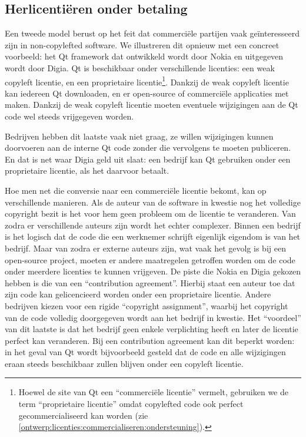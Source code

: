 \subsection{Herlicentiëren onder betaling}
\label{ontwerp:licenties:commercialiseren:herlicentieren}

Een tweede model berust op het feit dat commerciële partijen vaak geïnteresseerd zijn in non-copylefted software. We illustreren dit opnieuw met een concreet voorbeeld: het Qt framework dat ontwikkeld wordt door Nokia en uitgegeven wordt door Digia. Qt is beschikbaar onder verschillende licenties: een weak copyleft licentie, en een proprietaire licentie\footnote{Hoewel de site van Qt een ``commerciële licentie'' vermelt, gebruiken we de term ``proprietaire licentie'' omdat copylefted code ook perfect gecommercialiseerd kan worden (zie \ref{ontwerp:licenties:commercialiseren:ondersteuning}).}. Dankzij de weak copyleft licentie kan iedereen Qt downloaden, en er open-source of commerciële applicaties met maken. Dankzij de weak copyleft licentie moeten eventuele wijzigingen aan de Qt code wel steeds vrijgegeven worden.

Bedrijven hebben dit laatste vaak niet graag, ze willen wijzigingen kunnen doorvoeren aan de interne Qt code zonder die vervolgens te moeten publiceren. En dat is net waar Digia geld uit slaat: een bedrijf kan Qt gebruiken onder een proprietaire licentie, als het daarvoor betaalt.

Hoe men net die conversie naar een commerciële licentie bekomt, kan op verschillende manieren. Als de auteur van de software in kwestie nog het volledige copyright bezit is het voor hem geen probleem om de licentie te veranderen. Van zodra er verschillende auteurs zijn wordt het echter complexer. Binnen een bedrijf is het logisch dat de code die een werknemer schrijft eigenlijk eigendom is van het bedrijf. Maar van zodra er externe auteurs zijn, wat vaak het gevolg is bij een open-source project, moeten er andere maatregelen getroffen worden om de code onder meerdere licenties te kunnen vrijgeven. De piste die Nokia en Digia gekozen hebben is die van een ``contribution agreement''. Hierbij staat een auteur toe dat zijn code kan gelicencieerd worden onder een proprietaire licentie. Andere bedrijven kiezen voor een rigide ``copyright assignment'', waarbij het copyright van de code volledig doorgegeven wordt aan het bedrijf in kwestie. Het ``voordeel'' van dit laatste is dat het bedrijf geen enkele verplichting heeft en later de licentie perfect kan veranderen. Bij een contribution agreement kan dit beperkt worden: in het geval van Qt wordt bijvoorbeeld gesteld dat de code en alle wijzigingen eraan steeds beschikbaar zullen blijven onder een copyleft licentie.


